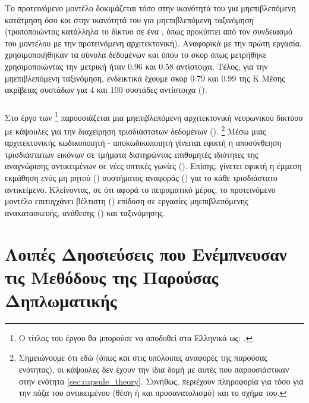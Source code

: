 Το προτεινόμενο μοντέλο δοκιμάζεται τόσο στην ικανότητά του για μη\textendash επιβλεπόμενη κατάτμηση όσο και στην ικανότητά του για μη\textendash επιβλεπόμενη ταξινόμηση (τροποποιώντας κατάλληλα το δίκτυο σε ένα , όπως προκύπτει από τον συνδειασμό του μοντέλου  με την προτεινόμενη αρχιτεκτονική). Αναφορικά με την πρώτη εργασία, χρησιμοποιήθηκαν τα σύνολα δεδομένων  και  όπου το σκορ όπως μετρήθηκε χρησιμοποιώντας την μετρική  ήταν 0.96 και 0.58 αντίστοιχα. Τέλος, για την μη\textendash επιβλεπόμενη ταξινόμηση, ενδεικτικά έχουμε σκορ 0.79 και 0.99 της Κ \textendash Μέσης ακρίβειας συστάδων για 4 και 100 συστάδες αντίστοιχα ().

\subsubsection{}

Στο έργο των  \footnote{Ο τίτλος του έργου θα μπορούσε να αποδοθεί στα Ελληνικά ως: .} \cite{sun2021canonical} παρουσιάζεται μια μη\textendash επιβλεπόμενη αρχιτεκτονική νευρωνικού δικτύου με κάψουλες για την διαχείρηση τρισδιάστατων δεδομένων (). \footnote{Σημειώνουμε ότι εδώ (όπως και στις υπόλοιπες αναφορές της παρούσας ενότητας), οι κάψουλες δεν έχουν την ίδια δομή με αυτές που παρουσιάστικαν στην ενότητα \ref{sec:capsule_theory}. Συνήθως, περιέχουν πληροφορία για τόσο για την πόζα του αντικειμένου (θέση ή και προσανατολισμό) και το σχήμα του.} Μέσω μιας αρχιτεκτονικής κωδικοποιητή - αποκωδικοποιητή γίνειται εφικτή η αποσύνθεηση τρισδιάστατων εικόνων σε τμήματα διατηρώντας επιθυμητές ιδιότητες της αναγνώρισης αντικειμένων σε νέες οπτικές γωνίες (). Επίσης, γίνετει εφικτή η έμμεση εκμάθηση ενός μη ρητού () συστήματος αναφοράς () για το κάθε τρισδιάστατο αντικείμενο. Κλείνοντας, σε ότι αφορά το πειραματικό μέρος, το προτεινόμενο μοντέλο επιτυγχάνει βέλτιστη () επίδοση σε εργασίες μη\textendash επιβλεπόμενης ανακατασκευής, ανάθεσης () και ταξινόμησης. 

\section{Λοιπές Δηοσιεύσεις που Ενέμπνευσαν τις Μεθόδους της Παρούσας Δηπλωματικής}

